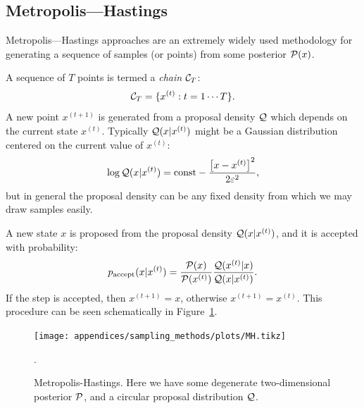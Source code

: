 \subsection{Metropolis---Hastings}
\label{sec:sm:mh}
Metropolis---Hastings approaches are an extremely widely used methodology for generating a sequence of samples (or points) from some posterior \(\mathcal{P}(x)\).

A sequence of \(T\) points is termed a {\em chain\/} \(\mathcal{C}_T\):
\begin{equation}
  \mathcal{C}_T = \{ x^{(t)}: t=1\cdots T \}.
\end{equation}
A new point \(x^{(t+1)}\) is generated from a proposal density \(\mathcal{Q}\) which depends on the current state \(x^{(t)}\). Typically \(\mathcal{Q}(x|x^{(t)})\) might be a Gaussian distribution centered on the current value of \(x^{(t)}\):
\begin{equation}
  \log \mathcal{Q}(x|x^{(t)}) = \text{const} -\frac{{\left[ x-x^{(t)} \right]}^2}{2\varepsilon^2},
\end{equation}
but in general the proposal density can be any fixed density from which we may draw samples easily.

A new state \(x\) is proposed from the proposal density \(\mathcal{Q}(x|x^{(t)})\), and it is accepted with probability:
\begin{equation}
  p_\mathrm{accept}(x|x^{(t)}) = \frac{\mathcal{P}(x)}{\mathcal{P}(x^{(t)})}\frac{\mathcal{Q}(x^{(t)}|x)}{\mathcal{Q}(x|x^{(t)})}.
\end{equation}
If the step is accepted, then \(x^{(t+1)}=x\), otherwise \(x^{(t+1)} = x^{(t)}\). This procedure can be seen schematically in Figure~\ref{fig:sm:MH}.
\begin{figure}[tp]
  \centering
  \texttt{[image: appendices/sampling\_methods/plots/MH.tikz]}
  \caption{Metropolis-Hastings. Here we have some degenerate two-dimensional posterior \(\mathcal{P}\), and a circular proposal distribution \(\mathcal{Q}\).\label{fig:sm:MH}}.
\end{figure}


